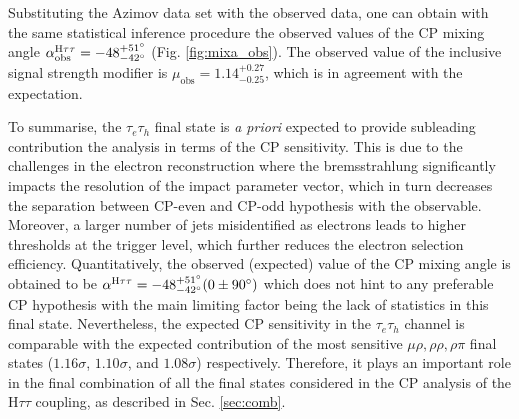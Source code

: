 Substituting the Azimov data set with the observed data, one can obtain with the same statistical inference procedure the observed values of the CP mixing angle $\alpha^{\text{H}\tau\tau}_\text{obs} = -48^{+51^\circ}_{-42^\circ}$ (Fig. \ref{fig:mixa_obs}). The observed value of the inclusive signal strength modifier is $\mu_\text{obs} = 1.14^{+0.27}_{-0.25}$, which is in agreement with the expectation. 

To summarise, the $\tau_e\tau_h$ final state is \textit{a priori} expected to provide subleading contribution the analysis in terms of the CP sensitivity. This is due to the challenges in the electron reconstruction where the bremsstrahlung significantly impacts the resolution of the impact parameter vector, which in turn decreases the separation between CP-even and CP-odd hypothesis with the \phicp observable. Moreover, a larger number of jets misidentified as electrons leads to higher \pt thresholds at the trigger level, which further reduces the electron selection efficiency. Quantitatively, the observed (expected) value of the CP mixing angle is obtained to be $\alpha^{\text{H}\tau\tau} = -48^{+51^\circ}_{-42^\circ} (0 \pm 90^\circ)$ which does not hint to any preferable CP hypothesis with the main limiting factor being the lack of statistics in this final state. Nevertheless, the expected CP sensitivity in the $\tau_e\tau_h$ channel is comparable with the expected contribution of the most sensitive $\mu\rho, \rho\rho, \rho\pi$ final states ($1.16\sigma$, $1.10\sigma$, and $1.08\sigma$) respectively. Therefore, it plays an important role in the final combination of all the final states considered in the CP analysis of the $\text{H}\tau\tau$ coupling, as described in Sec. \ref{sec:comb}.